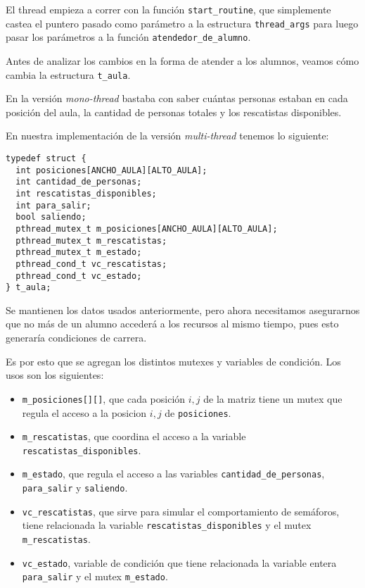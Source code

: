 \documentclass[a4paper]{article}
\begin{document}
El thread empieza a correr con la función \verb|start_routine|, que
simplemente castea el puntero pasado como parámetro a la estructura
\verb|thread_args| para luego pasar los parámetros a la función
\verb|atendedor_de_alumno|.

Antes de analizar los cambios en la forma de atender a los alumnos, veamos
cómo cambia la estructura \verb|t_aula|.

En la versión \textit{mono-thread} bastaba con saber cuántas personas
estaban en cada posición del aula, la cantidad de personas totales y los
rescatistas disponibles.

En nuestra implementación de la versión \textit{multi-thread} tenemos lo
siguiente:
\begin{verbatim}
typedef struct {
  int posiciones[ANCHO_AULA][ALTO_AULA];
  int cantidad_de_personas;
  int rescatistas_disponibles;
  int para_salir;
  bool saliendo;
  pthread_mutex_t m_posiciones[ANCHO_AULA][ALTO_AULA];
  pthread_mutex_t m_rescatistas;
  pthread_mutex_t m_estado;
  pthread_cond_t vc_rescatistas;
  pthread_cond_t vc_estado;
} t_aula;
\end{verbatim}

Se mantienen los datos usados anteriormente, pero ahora necesitamos
asegurarnos que no más de un alumno accederá a los recursos al mismo
tiempo, pues esto generaría condiciones de carrera.

Es por esto que se agregan los distintos mutexes y variables de condición.
Los usos son los siguientes:

\begin{itemize}
  \item \verb|m_posiciones[][]|, que cada posición $i,j$ de la matriz
  tiene un mutex que regula el acceso a la posicion $i, j$ de
  \verb|posiciones|.
  \item \verb|m_rescatistas|, que coordina el acceso a la variable
  \verb|rescatistas_disponibles|.
  \item \verb|m_estado|, que regula el acceso a las variables
  \verb|cantidad_de_personas|, \verb|para_salir| y \verb|saliendo|.
  \item \verb|vc_rescatistas|, que sirve para simular el comportamiento de
  semáforos, tiene relacionada la variable \verb|rescatistas_disponibles| y
  el mutex \verb|m_rescatistas|.
  \item \verb|vc_estado|, variable de condición que tiene relacionada la
  variable entera \verb|para_salir| y el mutex \verb|m_estado|.
\end{itemize}
\end{document}
